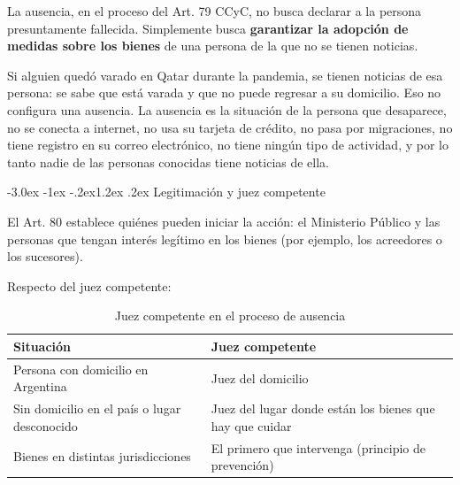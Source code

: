 \documentclass[12pt,oneside]{book}
\makeatletter
\renewcommand\section{\@startsection{section}{1}{\z@}%
  {-3.0ex \@plus -1ex \@minus -.2ex}{1.2ex \@plus .2ex}%
  {\normalfont\large\bfseries\color{acento}}}
\makeatother
\begin{document}
\begin{definicion}[{Ausencia}]
La ausencia, en el proceso del Art. 79 CCyC, no busca declarar a la
persona presuntamente fallecida. Simplemente busca \textbf{garantizar la
adopción de medidas sobre los bienes} de una persona de la que no se
tienen noticias.
\end{definicion}

\begin{ejemplo}
Si alguien quedó varado en Qatar durante la pandemia, se tienen noticias
de esa persona: se sabe que está varada y que no puede regresar a su
domicilio. Eso no configura una ausencia. La ausencia es la situación de
la persona que desaparece, no se conecta a internet, no usa su tarjeta de
crédito, no pasa por migraciones, no tiene registro en su correo
electrónico, no tiene ningún tipo de actividad, y por lo tanto nadie de
las personas conocidas tiene noticias de ella.
\end{ejemplo}

\section{Legitimación y juez competente}

\begin{regla}
El Art. 80 establece quiénes pueden iniciar la acción: el Ministerio
Público y las personas que tengan interés legítimo en los bienes (por
ejemplo, los acreedores o los sucesores).
\end{regla}

Respecto del juez competente:

\begin{table}[H]
\centering
\begin{tabularx}{\textwidth}{>{\raggedright\arraybackslash}X >{\raggedright\arraybackslash}X}
\toprule
\textbf{Situación} & \textbf{Juez competente} \\
\midrule
Persona con domicilio en Argentina & Juez del domicilio \\
Sin domicilio en el país o lugar desconocido & Juez del lugar donde están los bienes que hay que cuidar \\
Bienes en distintas jurisdicciones & El primero que intervenga (principio de prevención) \\
\bottomrule
\end{tabularx}
\caption{Juez competente en el proceso de ausencia}
\end{table}
\end{document}
